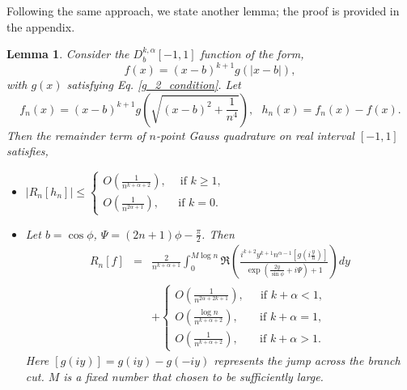 \documentclass[11pt]{article}
\newtheorem{lemma}{Lemma}
\begin{document}
Following the same approach, we state another lemma; the proof is provided in the appendix.
\begin{lemma} \label{lemma_g2}
    Consider the $D_b^{k,\alpha}[-1,1]$ function of the form, 
    \begin{equation}
        f(x) = (x-b)^{k+1} g(|x-b|),
    \end{equation}
    with $g(x)$ satisfying Eq. \eqref{g_2_condition}. Let
    \begin{equation}
        f_n(x) = (x-b)^{k+1} g(\sqrt{(x-b)^2+\frac{1}{n^4}}), \ \ \ h_n(x) = f_n(x) - f(x).
    \end{equation}
    Then the remainder term of $n$-point Gauss quadrature on real interval $[-1,1]$  satisfies,
    \begin{itemize}
        \item[(I)] 
        $\displaystyle |R_n[h_n]| \leq  \begin{cases}
        \displaystyle O(\frac{1}{n^{k+\alpha+2}}), \ \ \ \ \text{ if } k \geq 1,\\
        \displaystyle O(\frac{1}{n^{2\alpha+1}}), \ \ \ \ \ \ \text{ if } k=0.
    \end{cases}$
    \item[(II)] Let $b=\cos\phi$, $\Psi =(2n+1)\phi-\frac{\pi}{2}$. Then
    \begin{eqnarray}
            R_n[f] &=& \frac{2}{ n^{k+\alpha+1}}\int_{0}^{M\log n}  \Re\left(\frac{ i^{k+2}y^{k+1} n^{\alpha-1} \left[ g(i\frac{y}{n})\right] }{\exp\left(\frac{2y}{\sin\phi}+i\Psi\right) + 1}\right) dy \nonumber\\
        &&+\begin{cases}
        O(\frac{1}{n^{2\alpha+2k+1}}), \ \ \ \ \  \text{ if } k+\alpha <1,\\
        O(\frac{\log n}{n^{k+\alpha+2}}), \ \ \ \ \ \ \ \text{ if } k+\alpha =1,\\
        O(\frac{1}{n^{k+\alpha+2}}),\ \ \ \ \ \ \  \text{ if }  k+\alpha >1.
    \end{cases}
    \end{eqnarray}
    Here $\left[g(iy)\right] = g(iy)-g(-iy)$ represents the jump across the branch cut. $M$ is a fixed number that chosen to be sufficiently large.
    \end{itemize}
\end{lemma}
\end{document}
